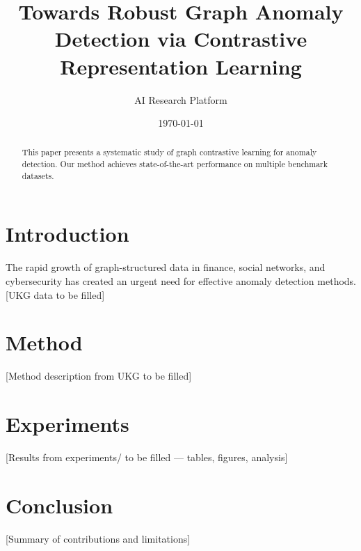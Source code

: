 \documentclass{article}
\title{Towards Robust Graph Anomaly Detection via Contrastive Representation Learning}
\author{AI Research Platform}
\date{\today}
\begin{document}
\maketitle
\begin{abstract}
This paper presents a systematic study of graph contrastive learning for anomaly detection.
Our method achieves state-of-the-art performance on multiple benchmark datasets.
\end{abstract}
\section{Introduction}
The rapid growth of graph-structured data in finance, social networks, and cybersecurity
has created an urgent need for effective anomaly detection methods. [UKG data to be filled]
\section{Method}
[Method description from UKG to be filled]
\section{Experiments}
[Results from experiments/ to be filled — tables, figures, analysis]
\section{Conclusion}
[Summary of contributions and limitations]
\end{document}
